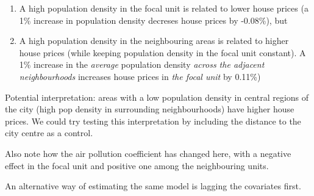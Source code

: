 \documentclass[
  letterpaper,
]{scrbook}
\begin{document}
\begin{tcolorbox}[enhanced jigsaw, colframe=quarto-callout-tip-color-frame, coltitle=black, titlerule=0mm, opacitybacktitle=0.6, toprule=.15mm, colbacktitle=quarto-callout-tip-color!10!white, toptitle=1mm, leftrule=.75mm, colback=white, bottomtitle=1mm, opacityback=0, left=2mm, title=\textcolor{quarto-callout-tip-color}{\faLightbulb}\hspace{0.5em}{Interpretaion SLX}, breakable, arc=.35mm, rightrule=.15mm, bottomrule=.15mm]

\begin{enumerate}
\def\labelenumi{\arabic{enumi}.}
\item
  A high population density in the focal unit is related to lower house
  prices (a 1\% increase in population density decreses house prices by
  -0.08\%), but
\item
  A high population density in the neighbouring areas is related to
  higher house prices (while keeping population density in the focal
  unit constant). A 1\% increase in the \emph{average} population
  density \emph{across the adjacent neighbourhoods} increases house
  prices in \emph{the focal unit} by 0.11\%)
\end{enumerate}

Potential interpretation: areas with a low population density in central
regions of the city (high pop density in surrounding neighbourhoods)
have higher house prices. We could try testing this interpretation by
including the distance to the city centre as a control.

\end{tcolorbox}

Also note how the air pollution coefficient has changed here, with a
negative effect in the focal unit and positive one among the
neighbouring units.

An alternative way of estimating the same model is lagging the
covariates first.
\end{document}
